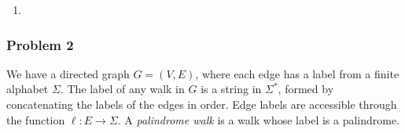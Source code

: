 \documentclass{article}
\newenvironment{solution}[1]{\begin{proof}[Solution by #1]}{\end{proof}}
\begin{document}
\begin{enumerate}
\begin{solution}{Eliot Robson}
        Now, we consider another 5 characters, \(a_7, \dots, a_{11}\). Again, there must be at least one 1 character (as \(w\) does not contain a 00000). Let \(j \in \set{7, \dots, 11}\) be the index of the last 1 character within this range. Then, by the choice of \(i\) earlier, \(j - i \geq 2\), serving as our desired indices. Our analysis succeeds setting \(c = 11\).
    \end{solution}
    
    \item
\end{enumerate}

\subsubsection{Problem 2}
We have a directed graph \(G = (V,E)\), where each edge has a label from a finite alphabet \(\Sigma\). The label of any walk in \(G\) is a string in \(\Sigma^*\), formed by concatenating the labels of the edges in order. Edge labels are accessible through the function \(\ell : E \to \Sigma\). A \textit{palindrome walk} is a walk whose label is a palindrome.
\end{document}
